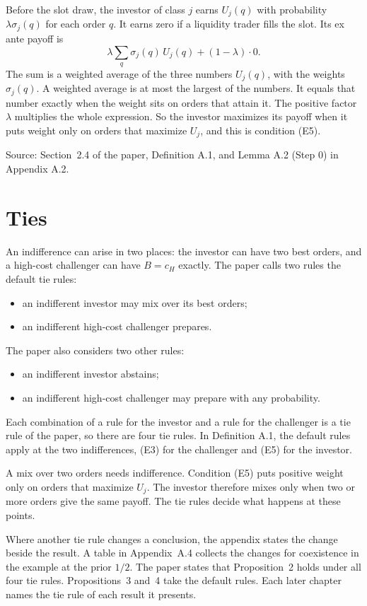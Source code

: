 Before the slot draw, the investor of class \(j\) earns \(U_j(q)\) with probability \(\lambda\sigma_j(q)\) for each order \(q\).
It earns zero if a liquidity trader fills the slot.
Its ex ante payoff is
\[
\lambda\sum_q\sigma_j(q)\,U_j(q)+(1-\lambda)\cdot0.
\]
The sum is a weighted average of the three numbers \(U_j(q)\), with the weights \(\sigma_j(q)\).
A weighted average is at most the largest of the numbers.
It equals that number exactly when the weight sits on orders that attain it.
The positive factor \(\lambda\) multiplies the whole expression.
So the investor maximizes its payoff when it puts weight only on orders that maximize \(U_j\), and this is condition (E5).

{\small\color{notegrey}Source: Section~2.4 of the paper, Definition A.1, and Lemma A.2 (Step 0) in Appendix A.2.}

\section{Ties}\label{sec:model-ties}

An indifference can arise in two places: the investor can have two best orders, and a high-cost challenger can have \(B=c_H\) exactly.
The paper calls two rules the default tie rules:
\begin{itemize}
\item an indifferent investor may mix over its best orders;
\item an indifferent high-cost challenger prepares.
\end{itemize}
The paper also considers two other rules:
\begin{itemize}
\item an indifferent investor abstains;
\item an indifferent high-cost challenger may prepare with any probability.
\end{itemize}
Each combination of a rule for the investor and a rule for the challenger is a tie rule of the paper, so there are four tie rules.
In Definition A.1, the default rules apply at the two indifferences, (E3) for the challenger and (E5) for the investor.

A mix over two orders needs indifference.
Condition (E5) puts positive weight only on orders that maximize \(U_j\).
The investor therefore mixes only when two or more orders give the same payoff.
The tie rules decide what happens at these points.

Where another tie rule changes a conclusion, the appendix states the change beside the result.
A table in Appendix~A.4 collects the changes for coexistence in the example at the prior \(1/2\).
The paper states that Proposition~2 holds under all four tie rules.
Propositions~3 and~4 take the default rules.
Each later chapter names the tie rule of each result it presents.

